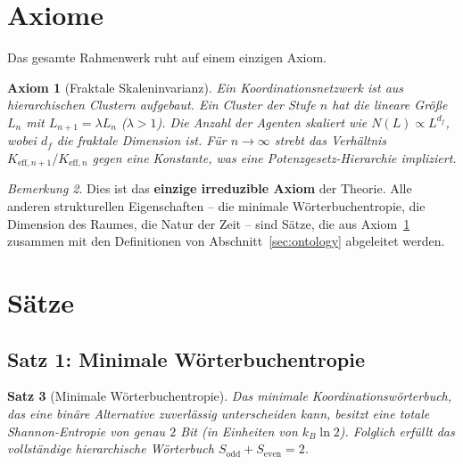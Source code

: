\documentclass[12pt,a4paper]{article}
\newtheorem{theorem}{Satz}[section]
\newtheorem{axiom}[theorem]{Axiom}
\theoremstyle{remark}
\newtheorem{remark}[theorem]{Bemerkung}
\begin{document}
	\section{Axiome}
	\label{sec:axioms}
	
	Das gesamte Rahmenwerk ruht auf einem einzigen Axiom.
	
	\begin{axiom}[Fraktale Skaleninvarianz]
		\label{ax:A1}
		Ein Koordinationsnetzwerk ist aus hierarchischen Clustern aufgebaut. Ein Cluster
		der Stufe \(n\) hat die lineare Größe \(L_n\) mit \(L_{n+1} = \lambda L_n\)
		(\(\lambda > 1\)). Die Anzahl der Agenten skaliert wie \(N(L) \propto L^{d_f}\),
		wobei \(d_f\) die fraktale Dimension ist. Für \(n \to \infty\) strebt das
		Verhältnis \(K_{\mathrm{eff},n+1}/K_{\mathrm{eff},n}\) gegen eine Konstante,
		was eine Potenzgesetz-Hierarchie impliziert.
	\end{axiom}
	
	\begin{remark}
		Dies ist das \textbf{einzige irreduzible Axiom} der Theorie. Alle anderen
		strukturellen Eigenschaften -- die minimale Wörterbuchentropie, die Dimension
		des Raumes, die Natur der Zeit -- sind Sätze, die aus Axiom~\ref{ax:A1} zusammen
		mit den Definitionen von Abschnitt~\ref{sec:ontology} abgeleitet werden.
	\end{remark}
	
	\section{Sätze}
	\label{sec:theorems}
	
	\subsection{Satz 1: Minimale Wörterbuchentropie}
	
	\begin{theorem}[Minimale Wörterbuchentropie]
		\label{thm:minimal-dict}
		Das minimale Koordinationswörterbuch, das eine binäre Alternative zuverlässig
		unterscheiden kann, besitzt eine totale Shannon-Entropie von genau \(2\) Bit
		(in Einheiten von \(k_B\ln 2\)). Folglich erfüllt das vollständige hierarchische
		Wörterbuch \(S_{\mathrm{odd}} + S_{\mathrm{even}} = 2\).
	\end{theorem}
	
\end{document}
